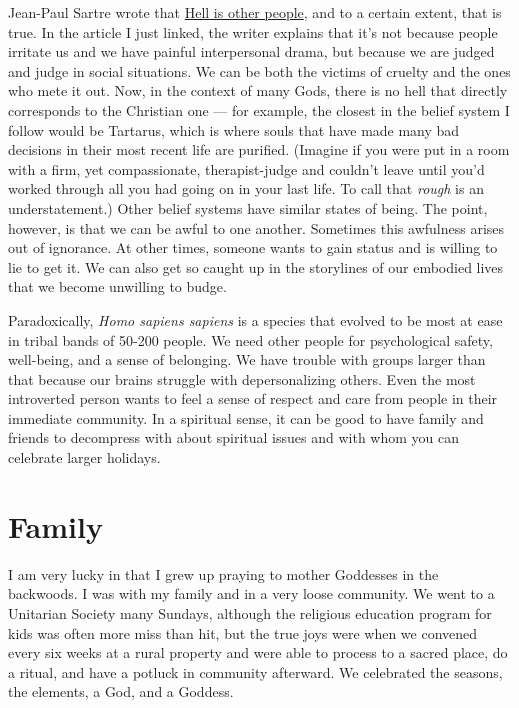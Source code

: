 \documentclass[
]{book}
\begin{document}
Jean-Paul Sartre wrote that \href{https://www.vox.com/2014/11/17/7229547/philosophy-quotes-misunderstood-wittgenstein-sartre-descartes}{Hell is other people}, and to a certain extent, that is true. In the article I just linked, the writer explains that it's not because people irritate us and we have painful interpersonal drama, but because we are judged and judge in social situations. We can be both the victims of cruelty and the ones who mete it out. Now, in the context of many Gods, there is no hell that directly corresponds to the Christian one --- for example, the closest in the belief system I follow would be Tartarus, which is where souls that have made many bad decisions in their most recent life are purified. (Imagine if you were put in a room with a firm, yet compassionate, therapist-judge and couldn't leave until you'd worked through all you had going on in your last life. To call that \emph{rough} is an understatement.) Other belief systems have similar states of being. The point, however, is that we can be awful to one another. Sometimes this awfulness arises out of ignorance. At other times, someone wants to gain status and is willing to lie to get it. We can also get so caught up in the storylines of our embodied lives that we become unwilling to budge.

Paradoxically, \emph{Homo sapiens sapiens} is a species that evolved to be most at ease in tribal bands of 50-200 people. We need other people for psychological safety, well-being, and a sense of belonging. We have trouble with groups larger than that because our brains struggle with depersonalizing others. Even the most introverted person wants to feel a sense of respect and care from people in their immediate community. In a spiritual sense, it can be good to have family and friends to decompress with about spiritual issues and with whom you can celebrate larger holidays.

\hypertarget{family}{%
\section{Family}\label{family}}

I am very lucky in that I grew up praying to mother Goddesses in the backwoods. I was with my family and in a very loose community. We went to a Unitarian Society many Sundays, although the religious education program for kids was often more miss than hit, but the true joys were when we convened every six weeks at a rural property and were able to process to a sacred place, do a ritual, and have a potluck in community afterward. We celebrated the seasons, the elements, a God, and a Goddess.
\end{document}
